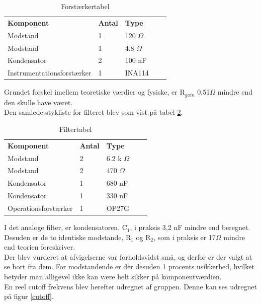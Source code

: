 \begin{table}[H]
\centering
\begin{tabular}{lllll}
\textbf{Komponent} & \textbf{Antal} & \textbf{Type}  &  &  \\ \cline{1-3}
Modstand           & 1              & 120 $\Omega$   &  &  \\ \cline{1-3}
Modstand           & 1              & 4.8 $\Omega$   &  &  \\ \cline{1-3}
Kondensator        & 2              & 100 nF         &  &  \\ \cline{1-3}
Instrumentationsforstærker &    1   & INA114		     &  &  \\ \cline{1-3}
\end{tabular}
\caption{Forstærkertabel}
\label{Forsttabel}
\end{table}

Grundet forskel imellem teoretiske værdier og fysiske, er R$_{gain}$ 0,51$\Omega$ mindre end den skulle have været.\\

Den samlede stykliste for filteret blev som vist på tabel \ref{Filtertabel}.

\begin{table}[H]
\centering
\begin{tabular}{lllll}
\textbf{Komponent} & \textbf{Antal} & \textbf{Type}  &  &  \\ \cline{1-3}
Modstand           & 2              & 6.2 k $\Omega$ &  &  \\ \cline{1-3}
Modstand           & 2              & 470 $\Omega$   &  &  \\ \cline{1-3}
Kondensator        & 1              & 680 nF         &  &  \\ \cline{1-3}
Kondensator        & 1              & 330 nF         &  &  \\ \cline{1-3}
Operationsforstærker &    1         & OP27G          &  &  \\ \cline{1-3}
\end{tabular}
\caption{Filtertabel}
\label{Filtertabel}
\end{table}

I det analoge filter, er kondensatoren, C$_1$, i praksis 3,2 nF mindre end  beregnet. Desuden er de to identiske modstande, R$_1$ og R$_2$, som i praksis er 17$\Omega$ mindre end teorien foreskriver.\\
Der blev vurderet at afvigelserne var forholdsvidst små, og derfor er der valgt at se bort fra dem. For modstandende er der desuden 1 procents usikkerhed, hvilket betyder man alligevel ikke kan være helt sikker på komponentværdien.\\
En reel cutoff frekvens blev herefter udregnet af gruppen. Denne kan ses udregnet på figur \ref{cutoff}.


